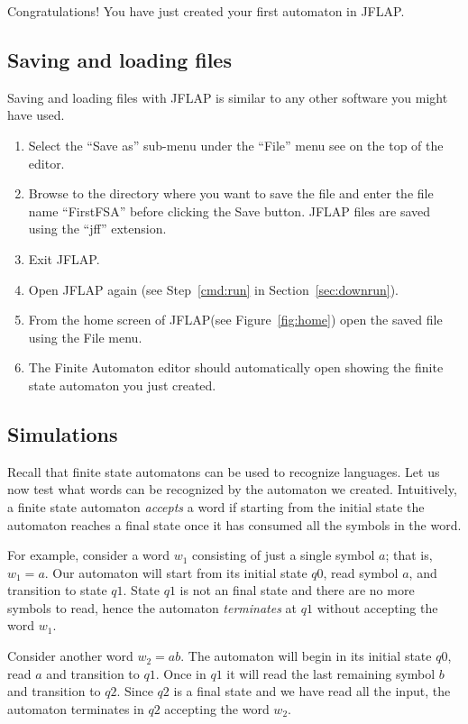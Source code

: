 \documentclass[11pt]{article}
\newcommand{\name}[1]{{\textsf{#1}}}
\newcommand{\jflap}{\name{JFLAP}\xspace}
\begin{document}
Congratulations! You have just created your first automaton in \jflap.
%



\subsection{Saving and loading files}


Saving and loading files with \jflap is similar to any other software you might have used.
\begin{enumerate}
  \item Select the ``Save as'' sub-menu under the ``File'' menu see on the top of the editor.
  \item Browse to the directory where you want to save the file and enter the file name ``FirstFSA'' before clicking the Save button. \jflap files are saved using the ``jff'' extension.
  \item Exit \jflap.
  \item Open \jflap again (see Step~\ref{cmd:run}  in Section~\ref{sec:downrun}).
  \item From the home screen of \jflap (see Figure~\ref{fig:home}) open the saved file using the File menu.
  \item The Finite Automaton editor should automatically open showing the finite state automaton you just created.
\end{enumerate}



\subsection{Simulations}


Recall that finite state automatons can be used to recognize languages. Let us now test what words can be recognized by the automaton we created. Intuitively, a finite state automaton
\emph{accepts} a word if starting from the initial state the automaton reaches a final state once it has consumed all the symbols in the word.

For example, consider a word $w_1$ consisting of just a single symbol $a$; that is, $w_1=a$.
Our automaton will start from its initial state $q0$, read symbol $a$, and transition to state $q1$. State $q1$ is not an final state and there are no more symbols to read, hence the automaton \emph{terminates} at $q1$ without accepting the word $w_1$.

Consider another word $w_2= ab$. The automaton will begin in its initial state $q0$, read $a$ and transition to $q1$. Once in $q1$ it will read the last remaining symbol $b$ and transition to $q2$. Since $q2$ is a final state and we have read all the input, the automaton terminates in $q2$ accepting the word $w_2$.
\end{document}
